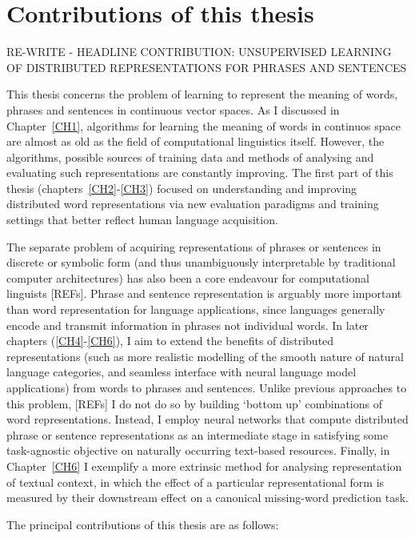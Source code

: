 
\section{Contributions of this thesis}


RE-WRITE - HEADLINE CONTRIBUTION: UNSUPERVISED LEARNING OF DISTRIBUTED REPRESENTATIONS FOR PHRASES AND SENTENCES


This thesis concerns the problem of learning to represent the meaning of words, phrases and sentences in continuous vector spaces. As I discussed in Chapter~\ref{CH1}, algorithms for learning the meaning of words in continuos space are almost as old as the field of computational linguistics itself. However, the algorithms, possible sources of training data and methods of analysing and evaluating such representations are constantly improving. The first part of this thesis (chapters~\ref{CH2}-\ref{CH3}) focused on understanding and improving distributed word representations via new evaluation paradigms and training settings that better reflect human language acquisition.

The separate problem of acquiring representations of phrases or sentences in discrete or symbolic form (and thus unambiguously interpretable by traditional computer architectures) has also been a core endeavour for computational linguists [REFs]. Phrase and sentence representation is arguably more important than word representation for language applications, since languages generally encode and transmit information in phrases not individual words. In later chapters (\ref{CH4}-\ref{CH6}), I aim to extend the benefits of distributed representations (such as more realistic modelling of the smooth nature of natural language categories, and seamless interface with neural language model applications) from words to phrases and sentences. Unlike previous approaches to this problem, [REFs] I do not do so by building `bottom up' combinations of word representations. Instead, I employ neural networks that compute distributed phrase or sentence representations as an intermediate stage in satisfying some task-agnostic objective on naturally occurring text-based resources. Finally, in Chapter~\ref{CH6} I exemplify a more extrinsic method for analysing representation of textual context, in which the effect of a particular representational form is measured by their downstream effect on a canonical missing-word prediction task.   

The principal contributions of this thesis are as follows:

